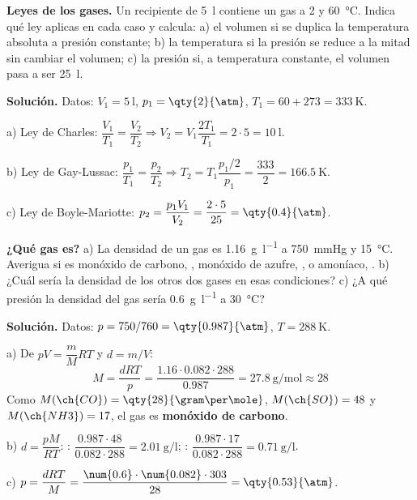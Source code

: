 \begin{example}
    \textbf{Leyes de los gases.} Un recipiente de \qty{5}{\litre} contiene un gas a \qty{2}{\atm} y \qty{60}{\degreeCelsius}.
    Indica qué ley aplicas en cada caso y calcula: a) el volumen si se duplica la temperatura absoluta a presión constante;
    b) la temperatura si la presión se reduce a la mitad sin cambiar el volumen; c) la presión si, a temperatura constante, el
    volumen pasa a ser \qty{25}{\litre}.

    \textbf{Solución.} Datos: \(V_1 = \qty{5}{\litre}\), \(p_1 = \qty{2}{\atm}\), \(T_1 = 60 + 273 = \qty{333}{\kelvin}\).

    a) Ley de Charles: \(\dfrac{V_1}{T_1} = \dfrac{V_2}{T_2} \Rightarrow V_2 = V_1 \dfrac{2 T_1}{T_1} = 2 \cdot 5 = \qty{10}{\litre}\).

    b) Ley de Gay-Lussac: \(\dfrac{p_1}{T_1} = \dfrac{p_2}{T_2} \Rightarrow T_2 = T_1 \dfrac{p_1/2}{p_1} = \dfrac{333}{2} = \qty{166.5}{\kelvin}\).

    c) Ley de Boyle-Mariotte: \(p_2 = \dfrac{p_1 V_1}{V_2} = \dfrac{2 \cdot 5}{25} = \qty{0.4}{\atm}\).
\end{example}

\begin{example}
    \textbf{¿Qué gas es?} a) La densidad de un gas es \qty{1.16}{\gram\per\litre} a \qty{750}{\mmHg} y \qty{15}{\degreeCelsius}.
    Averigua si es monóxido de carbono, , monóxido de azufre, , o amoníaco, . b) ¿Cuál sería la densidad de
    los otros dos gases en esas condiciones? c) ¿A qué presión la densidad del gas sería \qty{0.6}{\gram\per\litre} a
    \qty{30}{\degreeCelsius}?

    \textbf{Solución.} Datos: \(p = 750/760 = \qty{0.987}{\atm}\), \(T = \qty{288}{\kelvin}\).

    a) De \(p V = \dfrac{m}{M} R T\) y \(d = m/V\):
    \[ M = \frac{d R T}{p} = \frac{\num{1.16} \cdot \num{0.082} \cdot 288}{\num{0.987}} = \qty{27.8}{\gram\per\mole} \approx 28 \] Como \(M(\ch{CO}) = \qty{28}{\gram\per\mole}\), \(M(\ch{SO}) = 48\) y
    \(M(\ch{NH3}) = 17\), el gas es \textbf{monóxido de carbono}.

    b) \(d = \dfrac{p M}{R T}\): : \(\dfrac{\num{0.987} \cdot 48}{\num{0.082} \cdot 288} = \qty{2.01}{\gram\per\litre}\);
    : \(\dfrac{\num{0.987} \cdot 17}{\num{0.082} \cdot 288} = \qty{0.71}{\gram\per\litre}\).

    c) \(p = \dfrac{d R T}{M} = \dfrac{\num{0.6} \cdot \num{0.082} \cdot 303}{28} = \qty{0.53}{\atm}\).
\end{example}


